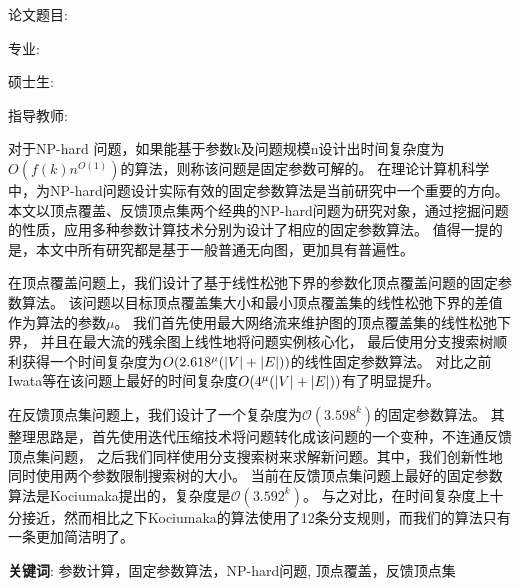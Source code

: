 ﻿

\setcounter{page}{1}
\renewcommand{\thepage}{\Roman{page}}
\setlength{\parindent}{0em}
论文题目: \,\ctitle

专\hspace{2em}业: \,\major

硕\hspace{0.5em}士\hspace{0.5em}生: \,\cauthor

指导教师: \,\supervisor
\setlength{\parindent}{2em}

\vspace{1.2cm}
 \centerline{}
\vspace{0.3cm}
对于NP-hard 问题，如果能基于参数k及问题规模n设计出时间复杂度为$O(f(k)n^{O(1)})$的算法，则称该问题是固定参数可解的。
在理论计算机科学中，为NP-hard问题设计实际有效的固定参数算法是当前研究中一个重要的方向。
本文以顶点覆盖、反馈顶点集两个经典的NP-hard问题为研究对象，通过挖掘问题的性质，应用多种参数计算技术分别为设计了相应的固定参数算法。
值得一提的是，本文中所有研究都是基于一般普通无向图，更加具有普遍性。

在顶点覆盖问题上，我们设计了基于线性松弛下界的参数化顶点覆盖问题的固定参数算法。
该问题以目标顶点覆盖集大小和最小顶点覆盖集的线性松弛下界的差值作为算法的参数$\mu$。
我们首先使用最大网络流来维护图的顶点覆盖集的线性松弛下界，
并且在最大流的残余图上线性地将问题实例核心化，
最后使用分支搜索树顺利获得一个时间复杂度为$O(2.618^\mu(\left\vert V \right\vert + \left\vert E \right\vert))$的线性固定参数算法。
对比之前Iwata等在该问题上最好的时间复杂度$O(4^\mu(\left\vert V \right\vert + \left\vert E \right\vert))$有了明显提升。

在反馈顶点集问题上，我们设计了一个复杂度为$\mathcal{O}(3.598^k)$的固定参数算法。
其整理思路是，首先使用迭代压缩技术将问题转化成该问题的一个变种，不连通反馈顶点集问题，
之后我们同样使用分支搜索树来求解新问题。其中，我们创新性地同时使用两个参数限制搜索树的大小。
当前在反馈顶点集问题上最好的固定参数算法是Kociumaka提出的，复杂度是$\mathcal{O}(3.592^k)$。
与之对比，在时间复杂度上十分接近，然而相比之下Kociumaka的算法使用了12条分支规则，而我们的算法只有一条更加简洁明了。

\vspace{1cm}

{\noindent\hei \textbf{关键词}}: {参数计算，固定参数算法，NP-hard问题, 顶点覆盖，反馈顶点集}
